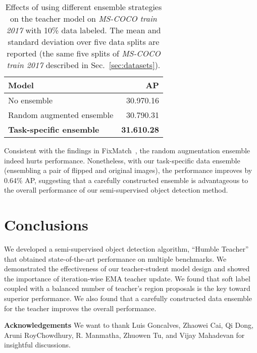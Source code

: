 \documentclass[final]{cvpr}
\begin{document}
\begin{table}[htbp]
  
  \centering
  \begin{tabular}{lr}
    \toprule
    Model &  AP\\
    \midrule
    No ensemble & 30.970.16 \\
    Random augmented ensemble & 30.790.31\\
    \textbf{Task-specific ensemble } & \textbf{31.610.28}\\
    \bottomrule
  \end{tabular}
   \caption{Effects of using different ensemble strategies on the teacher model on \textit{MS-COCO train 2017} with 10\% data labeled. The mean and standard deviation over five data splits are reported (the same five splits of \textit{MS-COCO train 2017} described in Sec.~\ref{sec:datasets}).}
   \label{tab:structural_ensemble}
\end{table}

Consistent with the findings in FixMatch~\cite{sohn2020fixmatch}, the random augmentation ensemble indeed hurts performance.
Nonetheless, with our task-specific data ensemble (ensembling a pair of flipped and original images), the performance improves by 0.64\% AP,
suggesting that a carefully constructed ensemble is advantageous to the overall performance of our semi-supervised object detection method.

\section{Conclusions}
We developed a semi-supervised object detection algorithm, ``Humble Teacher'' that obtained state-of-the-art performance on multiple benchmarks.
We demonstrated the effectiveness of our teacher-student model design and showed the importance of iteration-wise EMA teacher update.
We found that soft label coupled with a balanced number of teacher's region proposals is the key toward superior performance. 
We also found that a carefully constructed data ensemble for the teacher improves the overall performance.

\noindent\textbf{Acknowledgements}
We want to thank Luis Goncalves, Zhaowei Cai, Qi Dong, Aruni RoyChowdhury, R. Manmatha, Zhuowen Tu, and Vijay Mahadevan for insightful discussions.

{\small


}
\end{document}
